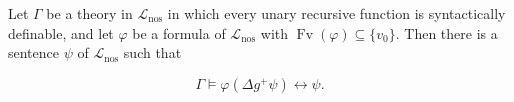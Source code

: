 Let $\Gamma$ be a theory in $\mathcal{L}_{\text{nos}}$ in which every unary recursive function is syntactically definable, and let $\varphi$ be a formula of $\mathcal{L}_{\text{nos}}$ with $\operatorname{Fv}(\varphi) \subseteq \{v_0\}$. Then there is a sentence $\psi$ of $\mathcal{L}_{\text{nos}}$ such that

$$\Gamma \models \varphi(\Delta g^+ \psi) \leftrightarrow \psi.$$
